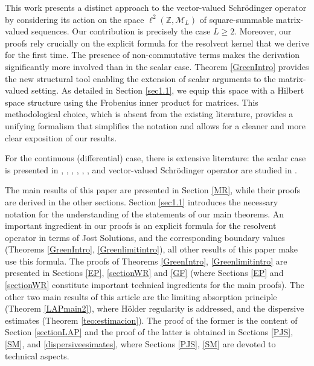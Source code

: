 \documentclass[12pt,oneside,onecolumn,open]{article}
\begin{document}
This work presents a distinct approach to the vector-valued Schr\"odinger operator by considering its action on the space $\ell ^{2}(\mathbb{Z},\mathcal{M}_L)$ of square-summable matrix-valued sequences. Our contribution is precisely the case $L \geq 2$. Moreover, our proofs rely crucially on the explicit formula for the resolvent kernel that we derive for the first time. The presence of non-commutative terms makes the derivation significantly more involved than in the scalar case. Theorem \ref{GreenIntro} provides the new structural tool enabling the extension of scalar arguments to the matrix-valued setting. As detailed in Section \ref{sec1.1}, we equip this space with a Hilbert space structure using the Frobenius inner product for matrices. This methodological choice, which is absent from the existing literature, provides a unifying formalism that simplifies the notation and allows for a cleaner and more clear exposition of our results.

For the continuous (differential) case, there is extensive literature: the scalar case is presented in \cite{MR2096737}, \cite{MR2127577}, \cite{MR1736195}, \cite{MR2096737}, \cite{MR3535363}, \cite{MR1980087}, and vector-valued Schr\"odinger operator are studied in \cite{MR4238229}.

The main results of this paper are presented in Section \ref{MR}, while their proofs are derived in the other sections. Section \ref{sec1.1} introduces the necessary notation for the understanding of the statements of our main theorems. An important ingredient in our proofs is an explicit formula for the resolvent operator in terms of Jost Solutions, and the corresponding boundary values (Theorems \ref{GreenIntro}, \ref{Greenlimitintro}), all other results of this paper make use this formula. The proofs of Theorems \ref{GreenIntro}, \ref{Greenlimitintro} are presented in Sections \ref{EP}, \ref{sectionWR} and \ref{GF} (where Sections \ref{EP} and \ref{sectionWR} constitute important technical ingredients for the main proofs). The other two main results of this article are the limiting absorption principle (Theorem \ref{LAPmain2}), where H\"older regularity is addressed, and the dispersive estimates (Theorem \ref{teo:estimacion}). The proof of the former is the content of Section \ref{sectionLAP} and the proof of the latter is obtained in Sections \ref{PJS}, \ref{SM}, and \ref{dispersiveesimates}, where Sections \ref{PJS}, \ref{SM} are devoted to technical aspects.
\end{document}

